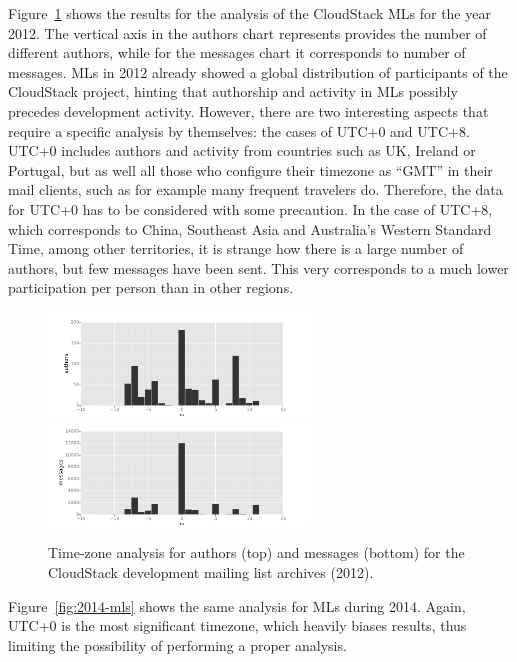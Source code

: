 \documentclass{sig-alternate-05-2015}
\begin{document}
Figure~\ref{fig:2012-mls} shows the results for the analysis of the
CloudStack MLs for the year 2012. The vertical axis in the authors chart represents provides the number of different authors, while for the messages chart it corresponds to number of messages. MLs in 2012 already showed a global distribution
of participants of the CloudStack project, hinting that authorship and activity
in MLs possibly precedes development activity. However, there are
two interesting aspects that require a specific analysis by themselves: the cases of UTC+0 and UTC+8. UTC+0 includes authors and activity from countries
such as UK, Ireland or Portugal, but as well all those who configure their timezone as ``GMT'' in their mail clients, such as for example many frequent travelers do. Therefore, the data for UTC+0 has to be considered with some precaution. In the case of UTC+8, which corresponds to China, Southeast Asia and Australia's Western Standard Time, among other territories, it is strange how there is a large number of authors, but few messages have been sent. This very corresponds to a much lower participation per person than in other regions.

\begin{figure}[!h]
\centering
\includegraphics[width=6.9cm]{figs/cloudstack/tz-mls-authors-2012.pdf}
\includegraphics[width=6.9cm]{figs/cloudstack/tz-mls-messages-2012.pdf}
\caption{Time-zone analysis for authors (top) and messages (bottom) for
the CloudStack development mailing list archives (2012).}
\label{fig:2012-mls}
\end{figure}

Figure~\ref{fig:2014-mls} shows the same analysis for MLs during 2014. Again, UTC+0 is the most significant timezone, which heavily biases results, thus limiting the possibility of performing a proper analysis.
\end{document}
